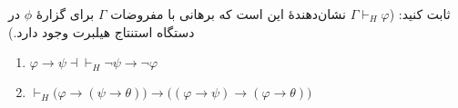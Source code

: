 ثابت کنید: ($\Gamma \vdash_H \varphi$ نشان‌دهندهٔ این است که برهانی با مفروضات $\Gamma$ برای گزارهٔ $\phi$ در دستگاه استنتاج هیلبرت وجود دارد.)
\begin{enumerate}[label=(\alph*)]
  \item $\varphi \rightarrow \psi \dashv\vdash_H \neg\psi \rightarrow \neg\varphi$
  \item $\vdash_H \big(\varphi \rightarrow (\psi \rightarrow \theta)\big) \rightarrow \big((\varphi \rightarrow \psi) \rightarrow (\varphi \rightarrow \theta)\big)$
\end{enumerate}
\begin{ans}
\end{ans}
